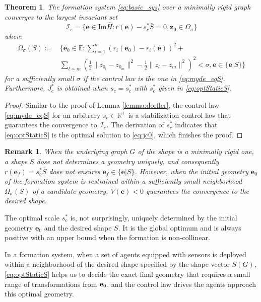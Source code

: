 \documentclass[times]{rncauth}
\newcommand{\be}{\ensuremath \mathbf{e}}
\newtheorem{thm}{Theorem}[section]
\newtheorem{rem}{Remark}[section]
\begin{document}
\begin{thm}
The formation system \eqref{eq:basic_sys} over a minimally rigid
graph converges to the largest invariant set
\begin{equation}
\mathcal{I}_e=\{\mathbf{e}\in \text{Im} \hat{H}:
r(\mathbf{e})-s^*_c\bar{S}=0,\mathbf{z}_0\in\Omega_\sigma\}
\end{equation}
where
\begin{align}\label{eq:omega}
\Omega_\sigma(S):=&\{\mathbf{e}_0\in \mathbb{E}:
\sum_{i=1}^n(r_i(\mathbf{e}_0)-r_i(\mathbf{e}))^2+\nonumber\\
&\sum_{l\not\sim
m}(\frac{1}{2}\|z_{0_l}-z_{0_m}\|^2-\frac{1}{2}\|z_l-z_m\|^2)^2<\sigma,\mathbf{e}\in\{\mathbf{e}|S\}\}
\end{align}
for a sufficiently small $\sigma$ if the control law  is the one in
\eqref{eq:myde_eqS}. Furthermore, $J^*_c$ is obtained when
$s_c=s^*_c$ with $s^*_c$ given in \eqref{eq:optStaticS}.
\end{thm}
\begin{proof}
  Similar to the proof of Lemma \ref{lemma:dorfler},
  the control law \eqref{eq:myde_eqS} for an arbitrary  $s_c\in\mathbb{R}^+$
   is a stabilization control law that guarantees the convergence to
   $\mathcal{I}_e$.
The derivation of $s^*_c$ indicates that \eqref{eq:optStaticS} is
the optimal solution to \eqref{eq:jc0}, which finishes the proof.
\end{proof}
\begin{rem}\label{rem:initial}
 When the underlying graph $G$ of the  shape is a minimally rigid
one, a shape $S$ dose not determines a geometry uniquely, and
consequently $r(\mathbf{e}_f)=s^*_c\bar{S}$ dose not ensures
$\mathbf{e}_f\in\{\mathbf{e}|S\}$. However, when the initial
geometry $\mathbf{e}_0$ of the formation system is restrained within
a sufficiently small neighborhood $\Omega_\sigma(S)$ of a candidate
geometry, $\dot{V}(\mathbf{e})<0$ guarantees the convergence to the
desired shape.
\end{rem}

The optimal scale $s^*_c$ is, not surprisingly, uniquely determined
by the initial geometry $\mathbf{e}_0$ and the desired shape $S$. It
is the global optimum and is always positive with an upper bound
when the formation is non-collinear.

In a formation system, when a set of agents equipped with sensors is
deployed within a neighborhood of the desired shape specified by the
shape vector $S(G)$, \eqref{eq:optStaticS} helps us to decide the
exact final geometry that requires a small range of transformations
from $\be_0$, and the control law drives the agents approach this
optimal geometry.
\end{document}
